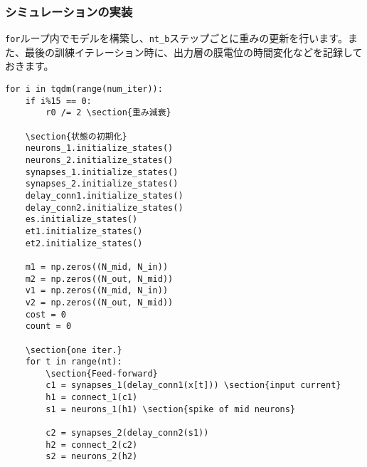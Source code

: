 \subsubsection{シミュレーションの実装}
\texttt{for}ループ内でモデルを構築し、\texttt{nt\_b}ステップごとに重みの更新を行います。また、最後の訓練イテレーション時に、出力層の膜電位の時間変化などを記録しておきます。
\begin{verbatim}
for i in tqdm(range(num_iter)):
    if i%15 == 0:
        r0 /= 2 \section{重み減衰}
    
    \section{状態の初期化}
    neurons_1.initialize_states()
    neurons_2.initialize_states()
    synapses_1.initialize_states()
    synapses_2.initialize_states()
    delay_conn1.initialize_states()
    delay_conn2.initialize_states()
    es.initialize_states()
    et1.initialize_states()
    et2.initialize_states()
    
    m1 = np.zeros((N_mid, N_in))
    m2 = np.zeros((N_out, N_mid))
    v1 = np.zeros((N_mid, N_in))
    v2 = np.zeros((N_out, N_mid))
    cost = 0
    count = 0
    
    \section{one iter.}
    for t in range(nt):
        \section{Feed-forward}
        c1 = synapses_1(delay_conn1(x[t])) \section{input current}
        h1 = connect_1(c1)
        s1 = neurons_1(h1) \section{spike of mid neurons}
        
        c2 = synapses_2(delay_conn2(s1))
        h2 = connect_2(c2)
        s2 = neurons_2(h2)
        

\end{verbatim}
